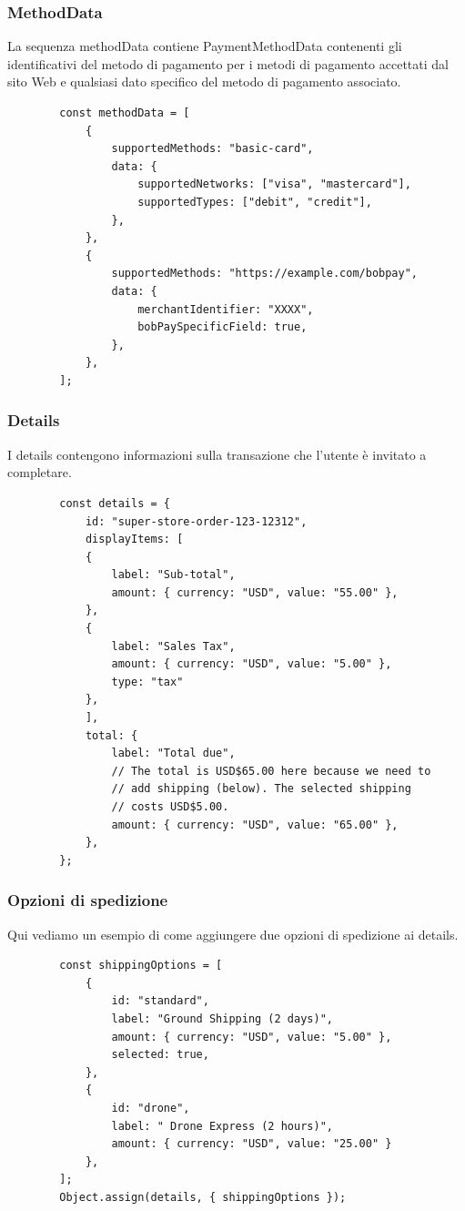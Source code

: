 \documentclass[italian]{article}
\begin{document}
	\subsubsection{MethodData}
	La sequenza methodData contiene PaymentMethodData contenenti gli identificativi del metodo di pagamento per i metodi di pagamento accettati dal sito Web e qualsiasi dato specifico del metodo di pagamento associato.
	\begin{lstlisting}
		const methodData = [
			{
				supportedMethods: "basic-card",
				data: {
					supportedNetworks: ["visa", "mastercard"],
					supportedTypes: ["debit", "credit"],
				},
			},
			{
				supportedMethods: "https://example.com/bobpay",
				data: {
					merchantIdentifier: "XXXX",
					bobPaySpecificField: true,
				},
			},
		];
	\end{lstlisting}
	
	\subsubsection{Details}
	I details contengono informazioni sulla transazione che l'utente è invitato a completare.
	\pagebreak
	\begin{lstlisting}
		const details = {
			id: "super-store-order-123-12312",
			displayItems: [
			{
				label: "Sub-total",
				amount: { currency: "USD", value: "55.00" },
			},
			{
				label: "Sales Tax",
				amount: { currency: "USD", value: "5.00" },
				type: "tax"
			},
			],
			total: {
				label: "Total due",
				// The total is USD$65.00 here because we need to
				// add shipping (below). The selected shipping
				// costs USD$5.00.
				amount: { currency: "USD", value: "65.00" },
			},
		};
	\end{lstlisting}
	
	\subsubsection{Opzioni di spedizione}
	Qui vediamo un esempio di come aggiungere due opzioni di spedizione ai details.
	\begin{lstlisting}
		const shippingOptions = [
			{
				id: "standard",
				label: "Ground Shipping (2 days)",
				amount: { currency: "USD", value: "5.00" },
				selected: true,
			},
			{
				id: "drone",
				label: " Drone Express (2 hours)",
				amount: { currency: "USD", value: "25.00" }
			},
		];
		Object.assign(details, { shippingOptions });
	\end{lstlisting}
	
\end{document}
